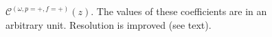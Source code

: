 \begin{figure}[H]
\begin{minipage}{.5\linewidth}
\end{minipage}%
\begin{minipage}{.5\linewidth}
\centering
{}
\end{minipage}
\caption{$ \mathcal{C}^{(\omega,p=+,f=+)}(z) $. The values of these coefficients are in an arbitrary unit. Resolution is improved (see text).}
\label{Cz_1}
\end{figure}





